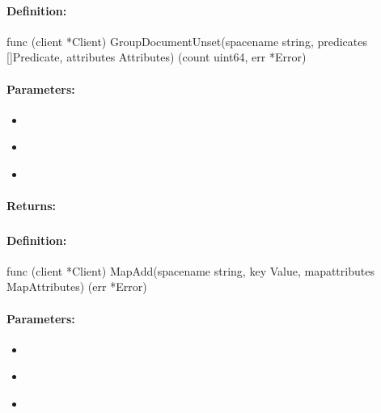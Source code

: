 \paragraph{Definition:}
\begin{gocode}
func (client *Client) GroupDocumentUnset(spacename string, predicates []Predicate, attributes Attributes) (count uint64, err *Error)
\end{gocode}

\paragraph{Parameters:}
\begin{itemize}[noitemsep]
\item {}\\

\item {}\\

\item {}\\

\end{itemize}

\paragraph{Returns:}


\pagebreak
\subsubsection{}
\label{api:Go:MapAdd}


\paragraph{Definition:}
\begin{gocode}
func (client *Client) MapAdd(spacename string, key Value, mapattributes MapAttributes) (err *Error)
\end{gocode}

\paragraph{Parameters:}
\begin{itemize}[noitemsep]
\item {}\\

\item {}\\

\item {}\\

\end{itemize}


